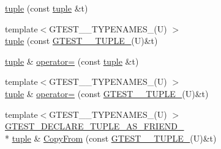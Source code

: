 \begin{DoxyCompactItemize}
\item 
\hyperlink{singletonstd_1_1tr1_1_1tuple_ade1807f6e6b36daa6387c3b00dbd3be6}{tuple} (const \hyperlink{singletonstd_1_1tr1_1_1tuple}{tuple} \&t)
\item 
{\footnotesize template$<$G\+T\+E\+S\+T\+\_\+\_\+\+T\+Y\+P\+E\+N\+A\+M\+E\+S\+\_\+(\+U) $>$ }\\\hyperlink{singletonstd_1_1tr1_1_1tuple_a7ff289d5c5a605e4a4f8fb56913f7370}{tuple} (const \hyperlink{namespacestd_1_1tr1_aa636d3269bf1f368a7bc09ff158bc482}{G\+T\+E\+S\+T\+\_\+\_\+\+T\+U\+P\+L\+E\+\_\+}(U)\&t)
\item 
\hyperlink{singletonstd_1_1tr1_1_1tuple}{tuple} \& \hyperlink{singletonstd_1_1tr1_1_1tuple_ae52bd211e87c30ea7243246fa06bf038}{operator=} (const \hyperlink{singletonstd_1_1tr1_1_1tuple}{tuple} \&t)
\item 
{\footnotesize template$<$G\+T\+E\+S\+T\+\_\+\_\+\+T\+Y\+P\+E\+N\+A\+M\+E\+S\+\_\+(\+U) $>$ }\\\hyperlink{singletonstd_1_1tr1_1_1tuple}{tuple} \& \hyperlink{singletonstd_1_1tr1_1_1tuple_a9ed59ab84e2ff750d0a188c3d9dac819}{operator=} (const \hyperlink{namespacestd_1_1tr1_aa636d3269bf1f368a7bc09ff158bc482}{G\+T\+E\+S\+T\+\_\+\_\+\+T\+U\+P\+L\+E\+\_\+}(U)\&t)
\item 
{\footnotesize template$<$G\+T\+E\+S\+T\+\_\+\_\+\+T\+Y\+P\+E\+N\+A\+M\+E\+S\+\_\+(\+U) $>$ }\\\hyperlink{gtest-tuple_8h_a2b20671273f514a88a6e9b8328e5f257}{G\+T\+E\+S\+T\+\_\+\+D\+E\+C\+L\+A\+R\+E\+\_\+\+T\+U\+P\+L\+E\+\_\+\+A\+S\+\_\+\+F\+R\+I\+E\+N\+D\+\_\+} \\*
\hyperlink{singletonstd_1_1tr1_1_1tuple}{tuple} \& \hyperlink{singletonstd_1_1tr1_1_1tuple_a3d06fb121d18b6e1c10d14f9e966618d}{Copy\+From} (const \hyperlink{namespacestd_1_1tr1_aa636d3269bf1f368a7bc09ff158bc482}{G\+T\+E\+S\+T\+\_\+\_\+\+T\+U\+P\+L\+E\+\_\+}(U)\&t)
\end{DoxyCompactItemize}
